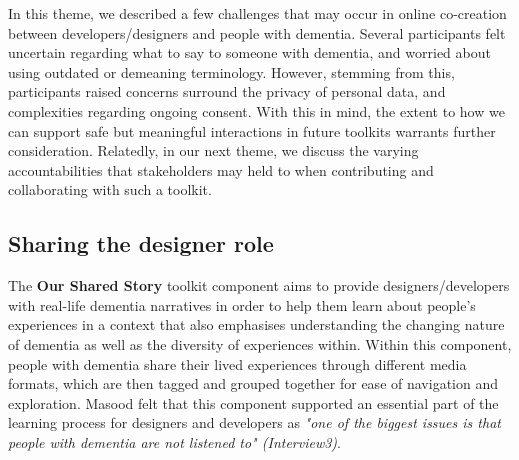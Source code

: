 In this theme, we described a few challenges that may occur in online co-creation between developers/designers and people with dementia. Several participants felt uncertain regarding what to say to someone with dementia, and worried about using outdated or demeaning terminology. However, stemming from this, participants raised concerns surround the privacy of personal data, and complexities regarding ongoing consent. With this in mind, the extent to how we can support safe but meaningful interactions in future toolkits warrants further consideration. Relatedly, in our next theme, we discuss the varying accountabilities that stakeholders may held to when contributing and collaborating with such a toolkit.

\subsection{Sharing the designer role}
The \textbf{Our Shared Story} toolkit component aims to provide designers/developers with real-life dementia narratives in order to help them learn about people’s experiences in a context that also emphasises understanding the changing nature of dementia as well as the diversity of experiences within. Within this component, people with dementia share their lived experiences through different media formats, which are then tagged and grouped together for ease of navigation and exploration. Masood felt that this component supported an essential part of the learning process for designers and developers as \textit{"one of the biggest issues is that people with dementia are not listened to" (Interview3)}. 

